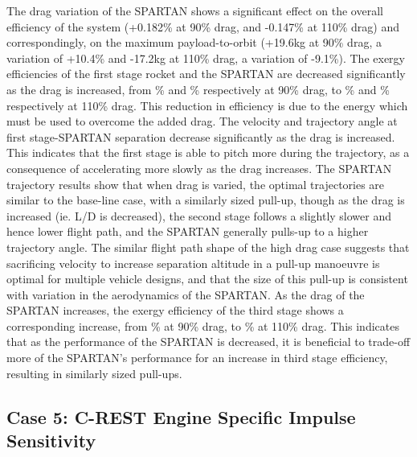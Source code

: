 The drag variation of the SPARTAN shows a significant effect on the overall efficiency of the system (+0.182\% at 90\% drag, and -0.147\% at 110\% drag) and correspondingly, on the maximum payload-to-orbit (+19.6kg at 90\% drag, a variation of +10.4\% and -17.2kg at 110\% drag, a variation of -9.1\%). The exergy efficiencies of the first stage rocket and the SPARTAN are decreased significantly as the drag is increased, from \firstExergyEffCdNinetyNoReturn\% and \secondExergyEffCdNinetyNoReturn\% respectively at 90\% drag, to \firstExergyEffCdOneHundredTenNoReturn\% and \secondExergyEffCdOneHundredTenNoReturn\% respectively at 110\% drag. This reduction in efficiency is due to the energy which must be used to overcome the added drag. 
The velocity and trajectory angle at first stage-SPARTAN separation decrease significantly as the drag is increased. This indicates that the first stage is able to pitch more during the trajectory, as a consequence of accelerating more slowly as the drag increases.
The SPARTAN trajectory results show that when drag is varied, the optimal trajectories are similar to the base-line case, with a similarly sized pull-up, though as the drag is increased (ie. L/D is decreased), the second stage follows a slightly slower and hence lower flight path, and the SPARTAN generally pulls-up to a higher trajectory angle. The similar flight path shape of the high drag case suggests that sacrificing velocity to increase separation altitude in a pull-up manoeuvre is optimal for multiple vehicle designs, and that the size of this pull-up is consistent with variation in the aerodynamics of the SPARTAN.
As the drag of the SPARTAN increases, the exergy efficiency of the third stage shows a corresponding increase, from \thirddExergyEffCdNinetyNoReturn\% at 90\% drag, to \thirddExergyEffCdOneHundredTenNoReturn\% at 110\% drag. This indicates that as the performance of the SPARTAN is decreased, it is beneficial to trade-off more of the SPARTAN's performance for an increase in third stage efficiency, resulting in similarly sized pull-ups. 


\subsection{Case 5: C-REST Engine Specific Impulse Sensitivity}\label{sec:ispsensitivitynoflyback}

